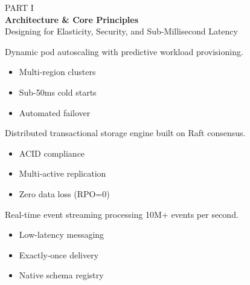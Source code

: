 \documentclass[landscape,20pt]{foils}
\begin{document}
\foilhead{}
\begin{tcolorbox}[darkcard, height=0.80\textheight, halign=center, valign=center]
  {\Huge \textcolor{TealAccent}{PART I}} \\[14pt]
  {\Huge \bfseries Architecture \& Core Principles} \\[12pt]
  {\Large Designing for Elasticity, Security, and Sub-Millisecond Latency}
\end{tcolorbox}

\foilhead{\textcolor{NavyDark}{\faCogs\ Core Architectural Pillars}}
\vspace{2pt}
\begin{minipage}[t]{0.31\textwidth}
  \begin{tcolorbox}[slidecard, title=\large \faServer\ Elastic Compute]
    Dynamic pod autoscaling with predictive workload provisioning.
    \begin{itemize}
      \item Multi-region clusters
      \item Sub-50ms cold starts
      \item Automated failover
    \end{itemize}
  \end{tcolorbox}
\end{minipage}%
\hfill
\begin{minipage}[t]{0.31\textwidth}
  \begin{tcolorbox}[slidecard, title=\large \faDatabase\ Storage Mesh]
    Distributed transactional storage engine built on Raft consensus.
    \begin{itemize}
      \item ACID compliance
      \item Multi-active replication
      \item Zero data loss (RPO=0)
    \end{itemize}
  \end{tcolorbox}
\end{minipage}%
\hfill
\begin{minipage}[t]{0.31\textwidth}
  \begin{tcolorbox}[slidecard, title=\large \faNetworkWired\ Event Highway]
    Real-time event streaming processing 10M+ events per second.
    \begin{itemize}
      \item Low-latency messaging
      \item Exactly-once delivery
      \item Native schema registry
    \end{itemize}
  \end{tcolorbox}
\end{minipage}
\end{document}
